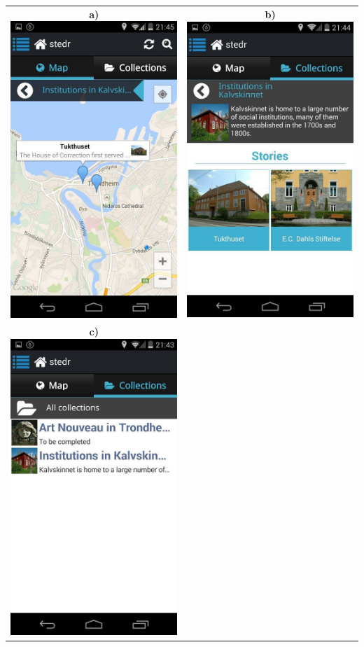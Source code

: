 \documentclass[12pt,a4paper,titlepage]{article}
\begin{document}
\begin{center}
\begin{tabular}{cc}
	 	\textbf{a)\hspace{0.2in}} \includegraphics[width=0.35 \textwidth]{res/ScreenShot1.jpg}	& 	
	 	\textbf{b)\hspace{0.2in}}\includegraphics[width=0.35 \textwidth]{res/ScreenShot2.jpg}\\
	 	\textbf{c)\hspace{0.2in}}\includegraphics[width=0.35 \textwidth]{res/ScreenShot3.jpg}	&

\end{tabular}
\end{center}
\end{document}
